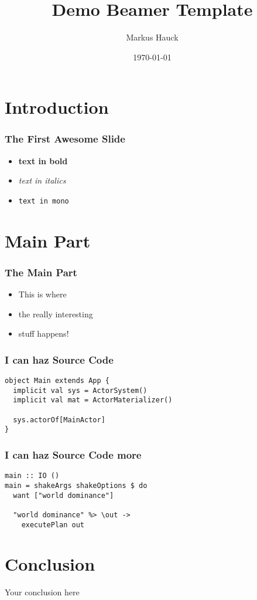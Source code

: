 \documentclass{beamer}
\title{Demo Beamer Template}
\author{Markus Hauck}
\date{\today}
\begin{document}
 
\frame{\titlepage}

\section{Introduction}
\label{sec:introduction}
 
\begin{frame}
\frametitle{The First Awesome Slide}
\begin{itemize}
\item \textbf{text in bold}
\item \textit{text in italics}
\item \texttt{text in mono}
\end{itemize}
\end{frame}

\section{Main Part}
\label{sec:main-part}
\begin{frame}
  \frametitle{The Main Part}
  \begin{itemize}
  \item This is where
  \item the really interesting
  \item stuff happens!
  \end{itemize}
\end{frame}

\begin{frame}[fragile]
  \frametitle{I can haz Source Code}
  \begin{center}
\begin{verbatim}
object Main extends App {
  implicit val sys = ActorSystem()
  implicit val mat = ActorMaterializer()
  
  sys.actorOf[MainActor]
}
\end{verbatim}
  \end{center}
\end{frame}

\begin{frame}[fragile]
  \frametitle{I can haz Source Code more}
  \begin{center}
\begin{verbatim}
main :: IO ()
main = shakeArgs shakeOptions $ do
  want ["world dominance"]

  "world dominance" %> \out ->
    executePlan out
\end{verbatim}
  \end{center}
\end{frame}

\section{Conclusion}
\label{sec:conclusion}

\begin{frame}
  \begin{center}
    \huge
    Your conclusion here
  \end{center}
\end{frame}
 
\end{document}
